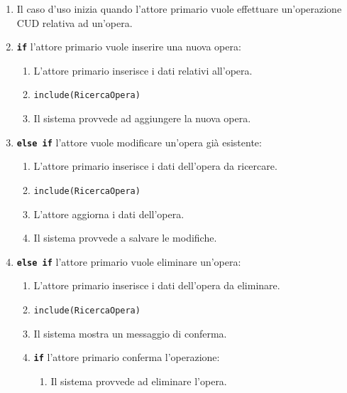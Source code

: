 \documentclass{article}
\begin{document}
		\begin{enumerate}[itemsep=8pt,parsep=0pt]
		
		\item 
		Il caso d'uso inizia quando l'attore primario vuole effettuare un’operazione CUD relativa ad un'opera.



		\item \texttt{\textbf{if}} l'attore primario vuole inserire una nuova opera:
			\begin{enumerate}	[leftmargin=28pt]
			\item L'attore primario inserisce i dati relativi all'opera.
			\item \texttt{{include(RicercaOpera)}}
			\item  Il sistema provvede ad aggiungere la nuova opera.
  			\end{enumerate}	



		\item \texttt{\textbf{else if}}  l’attore vuole modificare un'opera già esistente:
			\begin{enumerate}[leftmargin=28pt]
			    \item L'attore primario inserisce i dati dell'opera da ricercare.
				\item  \texttt{{include(RicercaOpera)}}
		        \item L'attore aggiorna i dati dell'opera.
		        \item  Il sistema provvede a salvare le modifiche.
  			\end{enumerate}	
  			
  		\item \texttt{\textbf{else if}} l'attore primario vuole eliminare un'opera:
			\begin{enumerate}	[leftmargin=28pt]
			\item L'attore primario inserisce i dati dell'opera da eliminare.
				\item \texttt{{include(RicercaOpera)}}
				\item  Il sistema mostra un messaggio di conferma.
				\item \texttt{\textbf{if}}  l'attore primario conferma l'operazione:
				    \begin{enumerate}	[leftmargin=28pt]
				    	   \item  Il sistema provvede ad eliminare l'opera.
				    \end{enumerate}
  			\end{enumerate}		
  			

	\end{enumerate}
	
\end{document}

